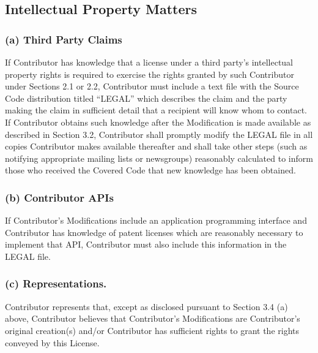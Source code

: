 \documentclass[letterpaper,colorlinks=true,linkcolor=blue]{book}
\begin{document}
\subsection{Intellectual Property Matters}
\subsubsection{(a) Third Party Claims}
If Contributor has knowledge that a license under a third party's intellectual property rights is required to exercise the rights granted by such Contributor under Sections 2.1 or 2.2, Contributor must include a text file with the Source Code distribution titled ``LEGAL'' which describes the claim and the party making the claim in sufficient detail that a recipient will know whom to contact. If Contributor obtains such knowledge after the Modification is made available as described in Section 3.2, Contributor shall promptly modify the LEGAL file in all copies Contributor makes available thereafter and shall take other steps (such as notifying appropriate mailing lists or newsgroups) reasonably calculated to inform those who received the Covered Code that new knowledge has been obtained. 

\subsubsection{(b) Contributor APIs}
If Contributor's Modifications include an application programming interface and Contributor has knowledge of patent licenses which are reasonably necessary to implement that API, Contributor must also include this information in the LEGAL file. 

\subsubsection{(c) Representations.}
Contributor represents that, except as disclosed pursuant to Section 3.4 (a) above, Contributor believes that Contributor's Modifications are Contributor's original creation(s) and/or Contributor has sufficient rights to grant the rights conveyed by this License. 
\end{document}
